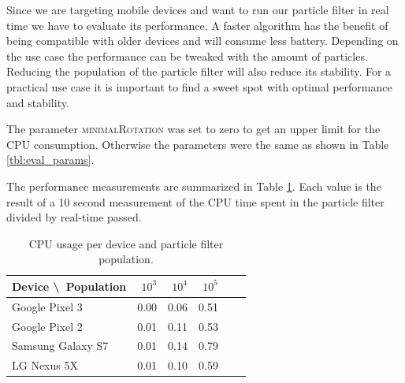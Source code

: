 Since we are targeting mobile devices and want to run our particle filter in real time we have to evaluate its performance. A faster algorithm has the benefit of being compatible with older devices and will consume less battery. Depending on the use case the performance can be tweaked with the amount of particles. Reducing the population of the particle filter will also reduce its stability. For a practical use case it is important to find a sweet spot with optimal performance and stability.

The parameter \textsc{minimalRotation} was set to zero to get an upper limit for the CPU consumption. Otherwise the parameters were the same as shown in Table \ref{tbl:eval_params}.

The performance measurements are summarized in Table \ref{tbl:eval_performance}. Each value is the result of a 10 second measurement of the CPU time spent in the particle filter divided by real-time passed.

\begin{table}[h]
    \centering
    \begin{tabular}{ | l | r | r | r | r | r | }
    \hline
    \textbf{Device \textbackslash \ Population} & $10^3$ & $10^4$ & $10^5$ \\ \hline
    Google Pixel 3    & 0.00 & 0.06 & 0.51 \\ \hline
    Google Pixel 2    & 0.01 & 0.11 & 0.53  \\ \hline
    Samsung Galaxy S7 & 0.01 & 0.14 & 0.79  \\ \hline
    LG Nexus 5X       & 0.01 & 0.10 & 0.59  \\ \hline
    \end{tabular}
    \caption{CPU usage per device and particle filter population.}
    \label{tbl:eval_performance}
\end{table}
